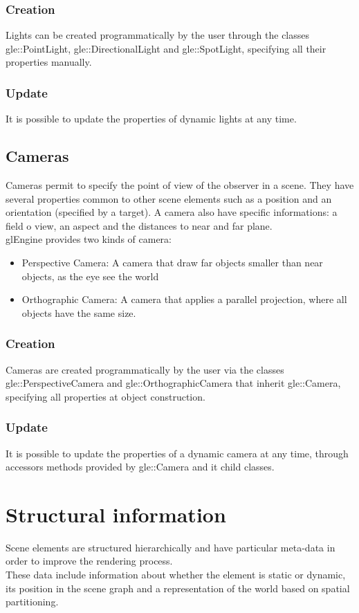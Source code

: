 \documentclass [a4 paper,11pt]{report}
\begin{document}
\subsubsection{Creation}
Lights can be created programmatically by the user through the classes gle::PointLight, gle::DirectionalLight and gle::SpotLight, specifying all their properties manually.
\subsubsection{Update}
It is possible to update the properties of dynamic lights at any time.

\subsection{Cameras}
Cameras permit to specify the point of view of the observer in a scene. They have several properties common to other scene elements such as a position and an orientation (specified by a target). A camera also have specific informations: a field o view, an aspect and the distances to near and far plane.\\
glEngine provides two kinds of camera:
\begin{itemize}
\item Perspective Camera: A camera that draw far objects smaller than near objects, as the eye see the world
\item Orthographic Camera: A camera that applies a parallel projection, where all objects have the same size.
\end{itemize}
\subsubsection{Creation}
Cameras are created programmatically by the user via the classes gle::PerspectiveCamera and gle::OrthographicCamera that inherit gle::Camera, specifying all properties at object construction.
\subsubsection{Update}
It is possible to update the properties of a dynamic camera at any time, through accessors methods provided by gle::Camera and it child classes.

\section{Structural information}
Scene elements are structured hierarchically and have particular meta-data in order to improve the rendering process.\\
These data include information about whether the element is static or dynamic, its position in the scene graph and a representation of the world based on spatial partitioning.
\end{document}

